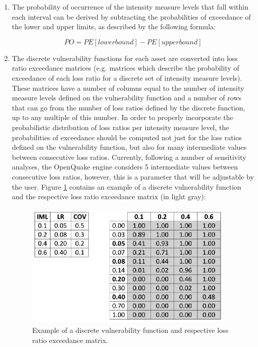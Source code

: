 \begin{enumerate}
\item The probability of occurrence of the intensity measure levels that fall within each interval can be derived by subtracting the probabilities of exceedance of the lower and upper limits, as described by the following formula:

\begin{equation}
PO= PE[lower bound]-PE[upper bound]
\end{equation}

\item The discrete vulnerability functions for each asset are converted into loss ratio exceedance matrices (e.g. matrices which describe the probability of exceedance of each loss ratio for a discrete set of intensity measure levels). These matrices have a number of columns equal to the number of intensity measure levels defined on the vulnerability function and a number of rows that can go from the number of loss ratios defined by the discrete function, up to any multiple of this number. In order to properly incorporate the probabilistic distribution of loss ratios per intensity measure level, the probabilities of exceedance should be computed not just for the loss ratios defined on the vulnerability function, but also for many intermediate values between consecutive loss ratios. Currently, following a number of sensitivity analyses, the OpenQuake engine considers 5 intermediate values between consecutive loss ratios, however, this is a parameter that will be adjustable by the user. Figure \ref{fig:LREM} contains an example of a discrete vulnerability function and the respective loss ratio exceedance matrix (in light gray):

\begin{figure}[ht]
\centering
\includegraphics[width=10cm,height=6cm]{./Figures/Part_Risk/LREM.eps}
\caption{Example of a discrete vulnerability function and respective loss ratio exceedance matrix.}
\label{fig:LREM}
\end{figure}


\end{enumerate}
